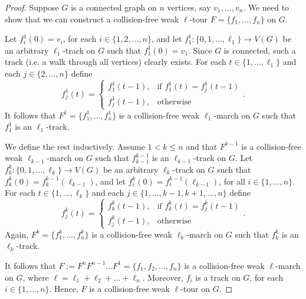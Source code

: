 \documentclass[10pt,a4paper]{amsart}
\begin{document}
\begin{proof}
   Suppose $G$ is a connected graph on $n$ vertices, say $v_1,\ldots,v_n$. We need to show that we can construct a collision-free weak $\ell$-tour $F=\{f_1,\ldots,f_n\}$ on $G$. 

   Let $f^1_i(0)=v_i$, for each $i\in\{1, 2, \ldots, n\}$, and let $f^1_1:\{0, 1, \ldots, \ell_1\}\rightarrow V(G)$ be an arbitrary $\ell_1$-track on $G$ such that $f^1_1(0)=v_1$. Since $G$ is connected, such a track (i.e. a walk through all vertices) clearly exists. For each $t\in\{1,\ldots,\ell_1\}$ and each $j\in\{2,\ldots,n\}$ define
   \[
    f^1_j(t) = \begin{cases}
                f^1_1(t-1), & \text{if } f^1_1(t) = f^1_j(t-1) \\
                f^1_j(t-1), & \text{otherwise}
             \end{cases}\text{.}
   \]
    It follows that $F^1=\{f^1_1, \ldots, f^1_n\}$ is a collision-free weak $\ell_1$-march on $G$ such that $f^1_1$ is an $\ell_1$-track.    

    We define the rest inductively. Assume $1<k\leq n$ and that $F^{k-1}$ is a collision-free weak $\ell_{k-1}$-march on $G$ such that $f^{k-1}_{k-1}$ is an $\ell_{k-1}$-track on $G$.
    Let $f^k_k:\{0, 1, \ldots, \ell_k\}\rightarrow V(G)$ be an arbitrary $\ell_k$-track on $G$ such that $f^k_k(0)=f^{k-1}_k(\ell_{k-1})$, and let $f^k_i(0)=f^{k-1}_i(\ell_{k-1})$, for all $i\in\{1,\ldots,n\}$. For each $t\in\{1,\ldots,\ell_k\}$ and each $j\in\{1,\ldots,k-1,k+1,\ldots,n\}$ define
   \[
    f^k_j(t) = \begin{cases}
                f^k_k(t-1), & \text{if } f^k_k(t) = f^k_j(t-1) \\
                f^k_j(t-1), & \text{otherwise}
             \end{cases}\text{.}
   \]
   Again, $F^k=\{f^k_1, \ldots, f^k_n\}$ is a collision-free weak $\ell_k$-march on $G$ such that $f^k_k$ is an $\ell_k$-track.

   It follows that $F:=F^n F^{n-1} \ldots F^1 = \{f_1, f_2, \ldots, f_n\}$ is a collision-free weak $\ell$-march on $G$, where $\ell=\ell_1+\ell_2+\ldots +\ell_n$. Moreover, $f_i$ is a track on $G$, for each $i\in \{1,\ldots,n\}$. Hence, $F$ is a collision-free weak $\ell$-tour on $G$.
\end{proof}
\end{document}
